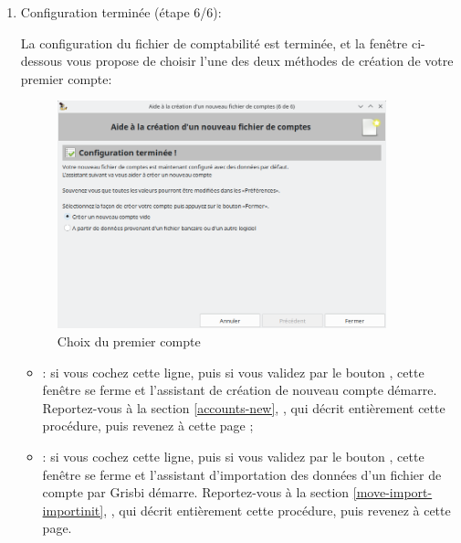 \begin{enumerate}
	\item Configuration terminée (étape 6/6):\par
	La configuration du fichier de comptabilité est terminée, et la fenêtre ci-dessous vous propose de choisir l'une des deux méthodes de création de votre premier
compte:%
\vspace{5mm}
\begin{figure}[htbp]
\begin{center}
\includegraphics[width=0.9\textwidth]{image/screenshot/start_account_choice}
\end{center}
\caption{Choix du premier compte}
\label{start_account_choice}
\end{figure}

		\begin{itemize}
			\item {} : si vous cochez cette ligne, puis si vous validez par le bouton , cette fenêtre se ferme et l'assistant de création de nouveau compte démarre. Reportez-vous à la section \vref{accounts-new}, , qui décrit entièrement cette procédure, puis revenez à cette page ;

			\item {} : si vous cochez cette ligne, puis si vous validez par le bouton , cette fenêtre se ferme et l'assistant d'importation des données d'un fichier de compte par Grisbi démarre. Reportez-vous à la section \vref{move-import-importinit}, , qui décrit entièrement cette procédure, puis revenez à cette page.
		\end{itemize}
\end{enumerate}

